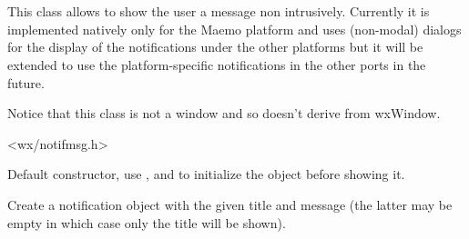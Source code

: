 
\section{}\label{wxnotificationmessage}

This class allows to show the user a message non intrusively. Currently it is
implemented natively only for the Maemo platform and uses (non-modal) dialogs
for the display of the notifications under the other platforms but it will be
extended to use the platform-specific notifications in the other ports in the
future.

Notice that this class is not a window and so doesn't derive from wxWindow.




<wx/notifmsg.h>



\label{wxnotificationmessagewxnotificationmessage}


Default constructor, use , 
 and 
 to initialize the object
before showing it.



Create a notification object with the given title and message (the
latter may be empty in which case only the title will be shown).


\label{wxnotificationmessageclose}


